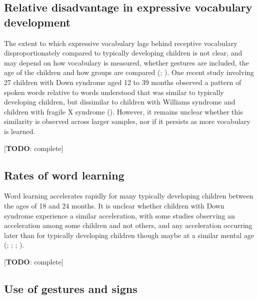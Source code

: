 \documentclass[
  11pt,
  a4paper,
]{report}
\begin{document}
\subsection{Relative disadvantage in expressive vocabulary
development}\label{relative-disadvantage-in-expressive-vocabulary-development}

The extent to which expressive vocabulary lags behind receptive
vocabulary disproportionately compared to typically developing children
is not clear, and may depend on how vocabulary is measured, whether
gestures are included, the age of the children and how groups are
compared
(;
). One recent study involving 27 children with Down syndrome aged
12 to 39 months observed a pattern of spoken words relative to words
understood that was similar to typically developing children, but
dissimilar to children with Williams syndrome and children with fragile
X syndrome
(). However, it remains unclear whether this similarity is
observed across larger samples, nor if it persists as more vocabulary is
learned.

{[}\textbf{TODO}: complete{]}

\subsection{Rates of word learning}\label{rates-of-word-learning}

Word learning accelerates rapidly for many typically developing children
between the ages of 18 and 24 months. It is unclear whether children
with Down syndrome experience a similar acceleration, with some studies
observing an acceleration among some children and not others, and any
acceleration occurring later than for typically developing children
though maybe at a similar mental age
(; ; ;
).

{[}\textbf{TODO}: complete{]}

\subsection{Use of gestures and signs}\label{use-of-gestures-and-signs}
\end{document}
